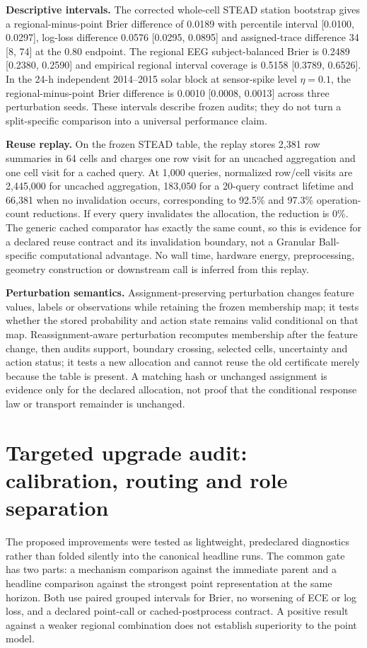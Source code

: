 \documentclass[11pt,a4paper]{article}
\numberwithin{equation}{section}
\theoremstyle{definition}\newtheorem{definition}[theorem]{Definition}
\theoremstyle{remark}\newtheorem{remark}[theorem]{Remark}
\begin{document}
\textbf{Descriptive intervals.} The corrected whole-cell STEAD station bootstrap gives a regional-minus-point Brier difference of 0.0189 with percentile interval [0.0100, 0.0297], log-loss difference 0.0576 [0.0295, 0.0895] and assigned-trace difference 34 [8, 74] at the 0.80 endpoint. The regional EEG subject-balanced Brier is 0.2489 [0.2380, 0.2590] and empirical regional interval coverage is 0.5158 [0.3789, 0.6526]. In the 24-h independent 2014--2015 solar block at sensor-spike level $\eta=0.1$, the regional-minus-point Brier difference is 0.0010 [0.0008, 0.0013] across three perturbation seeds. These intervals describe frozen audits; they do not turn a split-specific comparison into a universal performance claim.

\textbf{Reuse replay.} On the frozen STEAD table, the replay stores 2,381 row summaries in 64 cells and charges one row visit for an uncached aggregation and one cell visit for a cached query. At 1,000 queries, normalized row/cell visits are 2,445,000 for uncached aggregation, 183,050 for a 20-query contract lifetime and 66,381 when no invalidation occurs, corresponding to 92.5\% and 97.3\% operation-count reductions. If every query invalidates the allocation, the reduction is 0\%. The generic cached comparator has exactly the same count, so this is evidence for a declared reuse contract and its invalidation boundary, not a Granular Ball-specific computational advantage. No wall time, hardware energy, preprocessing, geometry construction or downstream call is inferred from this replay.

\textbf{Perturbation semantics.} Assignment-preserving perturbation changes feature values, labels or observations while retaining the frozen membership map; it tests whether the stored probability and action state remains valid conditional on that map. Reassignment-aware perturbation recomputes membership after the feature change, then audits support, boundary crossing, selected cells, uncertainty and action status; it tests a new allocation and cannot reuse the old certificate merely because the table is present. A matching hash or unchanged assignment is evidence only for the declared allocation, not proof that the conditional response law or transport remainder is unchanged.

\section{Targeted upgrade audit: calibration, routing and role separation}
\label{sec:upgradeaudit}
The proposed improvements were tested as lightweight, predeclared diagnostics rather than folded silently into the canonical headline runs. The common gate has two parts: a mechanism comparison against the immediate parent and a headline comparison against the strongest point representation at the same horizon. Both use paired grouped intervals for Brier, no worsening of ECE or log loss, and a declared point-call or cached-postprocess contract. A positive result against a weaker regional combination does not establish superiority to the point model.
\end{document}
